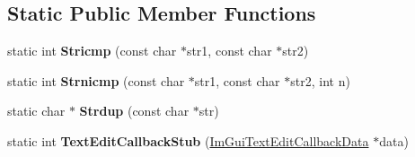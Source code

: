 \subsection*{Static Public Member Functions}
\begin{DoxyCompactItemize}
\item 
\mbox{\label{struct_example_app_console_a6e5e5d66e77618eff0f89785261c9391}} 
static int {\bfseries Stricmp} (const char $\ast$str1, const char $\ast$str2)
\item 
\mbox{\label{struct_example_app_console_a11bcb7a4b801e5eeb0c098c082fedc25}} 
static int {\bfseries Strnicmp} (const char $\ast$str1, const char $\ast$str2, int n)
\item 
\mbox{\label{struct_example_app_console_a61d0da41ef31ea8690b23681a1e54dba}} 
static char $\ast$ {\bfseries Strdup} (const char $\ast$str)
\item 
\mbox{\label{struct_example_app_console_a722d9b5dc6df127f27c83afeee29bfd3}} 
static int {\bfseries Text\+Edit\+Callback\+Stub} (\hyperlink{struct_im_gui_text_edit_callback_data}{Im\+Gui\+Text\+Edit\+Callback\+Data} $\ast$data)
\end{DoxyCompactItemize}
